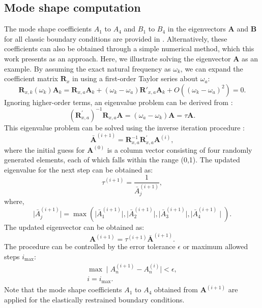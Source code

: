 \documentclass[preprint,12pt]{elsarticle}
\begin{document}
\subsection{Mode shape computation}
The mode shape coefficients $ A_1 $ to $ A_4 $ and $ B_1 $ to $ B_4$ in the eigenvectors $\mathbf{A}$ and $\mathbf{B}$ for all classic boundary conditions are provided in \cite{xing2020extended}. 
Alternatively, these coefficients can also be obtained through a simple numerical method, which this work presents as an approach.
Here, we illustrate solving the eigenvector $\mathbf{A}$ as an example.
By assuming the exact natural frequency as $\omega_k$, we can expand the coefficient matrix $ \mathbf{R}_{x} $ in  using a first-order Taylor series about $\omega_a$:
%
\begin{equation}\label{eq:Taylor}
	\mathbf{R}_{x,k}(\omega_k)\mathbf{A}_k = \mathbf{R}_{x,a}\mathbf{A}_k + (\omega_k - \omega_a)\mathbf{R}'_{x,a}\mathbf{A}_k + O\left((\omega_k - \omega_a)^2\right) = 0.
\end{equation}
%
Ignoring higher-order terms, an eigenvalue problem can be derived from :
%
\begin{equation}\label{eq:Newgeigen}
	(\mathbf{R}^{'}_{x,a})^{-1} \mathbf{R}_{x,a} \mathbf{A} = (\omega_a - \omega_k)\mathbf{A} = \tau \mathbf{A}.
\end{equation}
%
This eigenvalue problem can be solved using the inverse iteration procedure \cite{yuan2004second}:
%
\begin{equation}\label{eq:Inversepower}
	\bar{\mathbf{A}}^{(i+1)} = \mathbf{R}_{x,a}^{-1} \mathbf{R}^{'}_{x,a} \mathbf{A}^{(i)},	
\end{equation}
%
where the initial guess for $\mathbf{A}^{(0)}$ is a column vector consisting of four randomly generated elements, each of which falls within the range (0,1). The updated eigenvalue for the next step can be obtained as:
%
\begin{equation}\label{eq:Newgeigenvalue}
	\tau^{(i+1)} = \frac{1}{\bar{A}_j^{(i+1)}},
\end{equation}
%
where,
%
\begin{equation}\label{eq:updatetau}
	\mid \bar{A}_j^{(i+1)} \mid = \max(\mid \bar{A}_1^{(i+1)} \mid, \mid \bar{A}_2^{(i+1)} \mid, \mid\bar{A}_3^{(i+1)}\mid , \mid \bar{A}_4^{(i+1)} \mid).
\end{equation}
%
The updated eigenvector can be obtained as:
%
\begin{equation}\label{eq:updateeigenvalue}
	\mathbf{A}^{(i+1)} = \tau^{(i+1)} \bar{\mathbf{A}}^{(i+1)}.
\end{equation}
%
The procedure can be controlled by the error tolerance \( \epsilon \) or maximum allowed steps \( i_{\text{max}} \):
%
\begin{subequations}
	\begin{align}
		\max \mid A_n^{(i+1)} - A_n^{(i)} \mid < \epsilon, \\ 
		i = i_{\text{max}}.
	\end{align}
\end{subequations}
%
Note that the mode shape coefficients $A_1$ to $A_4$ obtained from $\mathbf{A}^{(i+1)}$ are applied for the elastically restrained boundary conditions.
\end{document}
